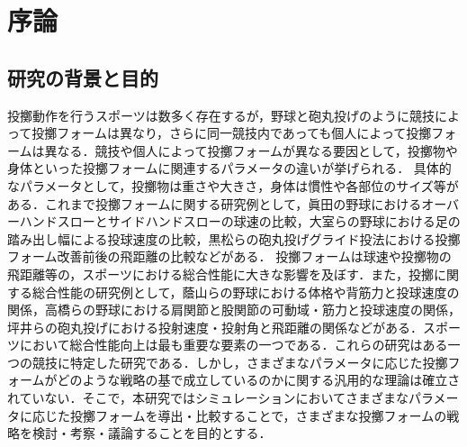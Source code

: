 \chapter[序論]%
        {序論}
        \section{研究の背景と目的}
        投擲動作を行うスポーツは数多く存在するが，野球と砲丸投げのように競技によって投擲フォームは異なり，さらに同一競技内であっても個人によって投擲フォームは異なる．競技や個人によって投擲フォームが異なる要因として，投擲物や身体といった投擲フォームに関連するパラメータの違いが挙げられる．
        具体的なパラメータとして，投擲物は重さや大きさ，身体は慣性や各部位のサイズ等がある．これまで投擲フォームに関する研究例として，眞田の野球におけるオーバーハンドスローとサイドハンドスローの球速の比較\cite{sanada}，大室らの野球における足の踏み出し幅による投球速度の比較\cite{omuro}，黒松らの砲丸投げグライド投法における投擲フォーム改善前後の飛距離の比較\cite{kuromatsu}などがある．
        投擲フォームは球速や投擲物の飛距離等の，スポーツにおける総合性能に大きな影響を及ぼす．また，投擲に関する総合性能の研究例として，蔭山らの野球における体格や背筋力と投球速度の関係\cite{kageyama}，高橋らの野球における肩関節と股関節の可動域・筋力と投球速度の関係\cite{takahashi}，坪井らの砲丸投げにおける投射速度・投射角と飛距離の関係\cite{tsuboi}などがある．スポーツにおいて総合性能向上は最も重要な要素の一つである．これらの研究はある一つの競技に特定した研究である．しかし，さまざまなパラメータに応じた投擲フォームがどのような戦略の基で成立しているのかに関する汎用的な理論は確立されていない．そこで，本研究ではシミュレーションにおいてさまざまなパラメータに応じた投擲フォームを導出・比較することで，さまざまな投擲フォームの戦略を検討・考察・議論することを目的とする．\\

